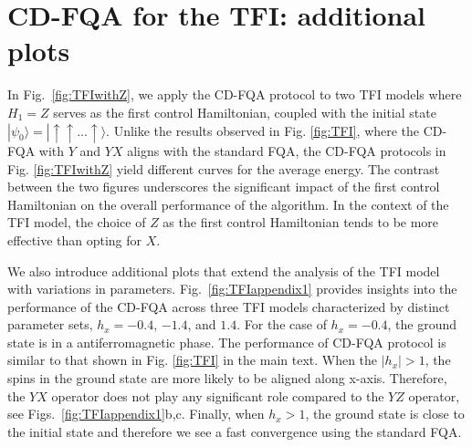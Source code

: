 \documentclass[twocolumn,aps,superscriptaddress,floatfix,longbibliography]{revtex4-2}
\newcommand{\ra}{\rangle}
\def\YX{\ensuremath{\mathit{YX}}\xspace} %
\def\YZ{\ensuremath{\mathit{YZ}}\xspace}
\begin{document}
\section{CD-FQA for the TFI: additional plots}

In Fig.~\ref{fig:TFIwithZ}, we apply the CD-FQA protocol to
two TFI models where $H_1=Z$ serves as the first control
Hamiltonian, coupled with the initial state
$|\psi_0\ra=|\uparrow \uparrow ...\uparrow\ra$. Unlike the
results observed in Fig. \ref{fig:TFI}, where the CD-FQA with
$Y$ and \YX aligns with the standard FQA, the CD-FQA protocols
in Fig. \ref{fig:TFIwithZ} yield different curves for the
average energy. The contrast between the two figures underscores
the significant impact of the first control Hamiltonian on the
overall performance of the algorithm. In the context of the TFI
model, the choice of $Z$ as the first control Hamiltonian tends
to be more effective than opting for $X$. 


We also introduce additional plots that extend the
analysis of the TFI model with variations in parameters. Fig.~\ref{fig:TFIappendix1} provides insights into the performance of
the CD-FQA across three TFI models characterized by distinct
parameter sets, $h_x=-0.4$, $-1.4$, and $1.4$. For the case of
$h_x=-0.4$, the ground state is in a antiferromagnetic phase.
The performance of CD-FQA protocol is similar to that shown in
Fig. \ref{fig:TFI} in the main text. When the $|h_x|>1$, the
spins in the ground state are more likely to be aligned along
x-axis. Therefore, the \YX operator does not play any
significant role compared to the \YZ operator, see Figs.~\ref{fig:TFIappendix1}b,c. Finally,  when $h_x>1$, the ground
state is close to the initial state and therefore we see a fast
convergence using the standard FQA. 
\end{document}
